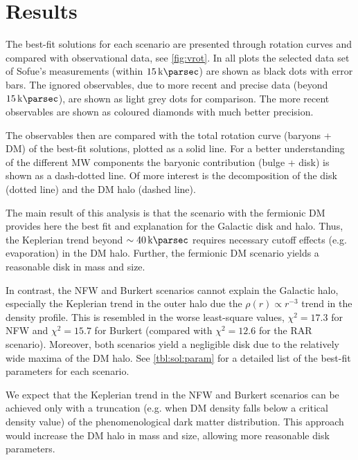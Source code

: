\section{Results}
\label{sec:results}
The best-fit solutions for each scenario are presented through rotation curves and compared with observational data, see \cref{fig:vrot}. In all plots the selected data set of Sofue's measurements (within $\SI{15}{\kilo\parsec}$) are shown as black dots with error bars. The ignored observables, due to more recent and precise data  (beyond $\SI{15}{\kilo\parsec}$), are shown as light grey dots for comparison. The more recent observables are shown as coloured diamonds with much better precision.


The observables then are compared with the total rotation curve (baryons + DM) of the best-fit solutions, plotted as a solid line. For a better understanding of the different MW components the baryonic contribution (bulge + disk) is shown as a dash-dotted line. Of more interest is the decomposition of the disk (dotted line) and the DM halo (dashed line).

The main result of this analysis is that the scenario with the fermionic DM provides here the best fit and explanation for the Galactic disk and halo. Thus, the Keplerian trend beyond $\sim\SI{40}{\kilo\parsec}$ requires necessary cutoff effects (e.g. evaporation) in the DM halo. Further, the fermionic DM scenario yields a reasonable disk in mass and size.

In contrast, the NFW and Burkert scenarios cannot explain the Galactic halo, especially the Keplerian trend in the outer halo due the $\rho(r) \propto r^{-3}$ trend in the density profile. This is resembled in the worse least-square values, $\chi^2 = 17.3$ for NFW and $\chi^2 = 15.7$ for Burkert (compared with $\chi^2 = 12.6$ for the RAR scenario). Moreover, both scenarios yield a negligible disk due to the relatively wide maxima of the DM halo. See \cref{tbl:sol:param} for a detailed list of the best-fit parameters for each scenario.



We expect that the Keplerian trend in the NFW and Burkert scenarios can be achieved only with a truncation (e.g. when DM density falls below a critical density value) of the phenomenological dark matter distribution. This approach would increase the DM halo in mass and size, allowing more reasonable disk parameters.

